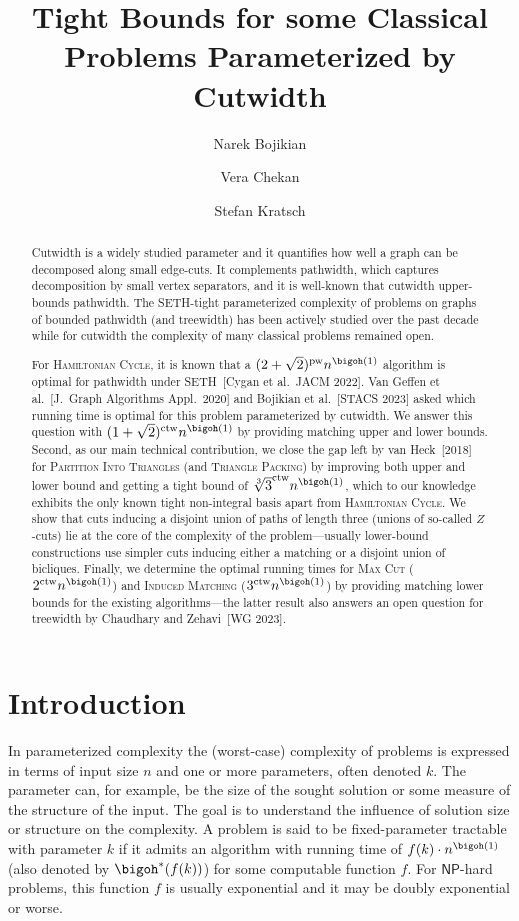\documentclass[a4paper,UKenglish,cleveref, autoref, thm-restate]{lipics-v2021}
\title{Tight Bounds for some Classical Problems Parameterized by Cutwidth}
\author{Narek Bojikian}{Humboldt-Universität zu Berlin, Germany}{bojikian@hu-berlin.de}{https://orcid.org/0000-0003-1072-4873}{}
\author{Vera Chekan}{Humboldt-Universität zu Berlin, Germany}{vera.chekan@informatik.hu-berlin.de}{https://orcid.org/0000-0002-6165-1566}{}
\author{Stefan Kratsch}{Humboldt-Universität zu Berlin, Germany}{kratsch@informatik.hu-berlin.de}{https://orcid.org/0000-0002-0193-7239}{}
\date{}
\begin{document}
\listoftodo
\maketitle

\begin{abstract} 
	Cutwidth is a widely studied parameter and it quantifies how well a graph can be decomposed along small edge-cuts.
	It complements pathwidth, which captures decomposition by small vertex separators, and it is well-known that cutwidth upper-bounds pathwidth.
	The SETH-tight parameterized complexity of problems on graphs of bounded pathwidth (and treewidth) has been actively studied over the past decade while for cutwidth the complexity of many classical problems remained open.
	
	For \textsc{Hamiltonian Cycle}, it is known that a $(2+\sqrt{2})^{\operatorname{pw}} n^{\bigoh(1)}$ algorithm is optimal for pathwidth under SETH~[Cygan et al.\ JACM 2022]. 
	Van Geffen et al.~[J.\ Graph Algorithms Appl.\ 2020] and Bojikian et al.~[STACS 2023] asked which running time is optimal for this problem parameterized by cutwidth.
	We answer this question with $(1+\sqrt{2})^{\operatorname{ctw}} n^{\bigoh(1)}$ by providing matching upper and lower bounds.
	Second, as our main technical contribution, we close the gap left by van Heck~[2018] 	for \textsc{Partition Into Triangles} (and \textsc{Triangle Packing}) by improving both upper and lower bound and getting a tight bound of $\sqrt[3]{3}^{\operatorname{ctw}} n^{\bigoh(1)}$, which to our knowledge exhibits the only known tight non-integral basis apart from \textsc{Hamiltonian Cycle}.
    We show that cuts inducing a disjoint union of paths of length three (unions of so-called $Z$-cuts) lie at the core of the complexity of the problem---usually lower-bound constructions use simpler cuts inducing either a matching or a disjoint union of bicliques.
	Finally, we determine the optimal running times for \textsc{Max Cut} ($2^{\operatorname{ctw}} n^{\bigoh(1)}$) and \textsc{Induced Matching} ($3^{\operatorname{ctw}} n^{\bigoh(1)}$) by providing matching lower bounds for the existing algorithms---the latter result also answers an open question for treewidth by Chaudhary and Zehavi~[WG 2023]. 
\end{abstract}

\section{Introduction}

In parameterized complexity the (worst-case) complexity of problems is expressed in terms of input size $n$ and one or more parameters, often denoted $k$. 
The parameter can, for example, be the size of the sought solution 
or some measure of the structure of the input.
The goal is to understand the influence of solution size or structure on the complexity.
A problem is said to be fixed-parameter tractable with parameter $k$ if it admits an algorithm with running time of $f(k) \cdot n^{\bigoh(1)}$ (also denoted by $\bigoh^*(f(k))$) for some computable function $f$. For $\mathsf{NP}$-hard problems, this function $f$ is usually exponential and it may be doubly exponential or worse.
\end{document}

